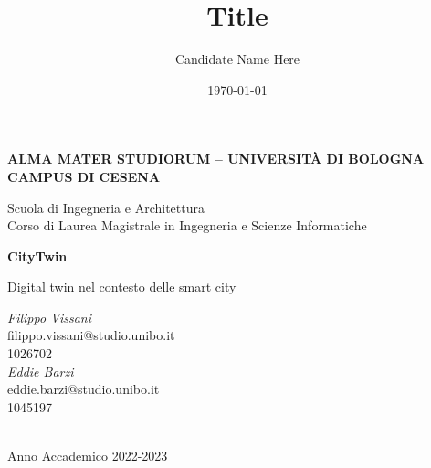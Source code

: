\title{Title}
\author{Candidate Name Here}
\date{\today}

\begin{titlepage}
	\begin{center}
		
		\large
		\textbf{ALMA MATER STUDIORUM -- UNIVERSITÀ DI BOLOGNA \\ CAMPUS DI CESENA}
		\\
		\noindent\hrulefill
		\vspace{0.4cm}
		
		\Large
		Scuola di Ingegneria e Architettura \\
		Corso di Laurea Magistrale in Ingegneria e Scienze Informatiche
		
		\Huge
		\vspace{4cm}
		\textbf{
			CityTwin
		}
		
		\large
		\vspace{1cm}
		Digital twin nel contesto delle smart city
		\\
		\vspace{5.5cm}
		\begin{minipage}[t]{0.64\textwidth}
			\begin{flushleft} 
				\textit{Filippo Vissani}
				\\
				filippo.vissani@studio.unibo.it
				\\
				1026702
				\\
				\vspace{0.4cm}
				\textit{Eddie Barzi}
				\\
				eddie.barzi@studio.unibo.it
				\\
    				1045197
			\end{flushleft}
		\end{minipage}
		
		\vfill
		\noindent\hrulefill
		\vspace{0.3cm}
		\Large
		\\
		Anno Accademico 2022-2023
	\end{center}
\end{titlepage}
\restoregeometry
